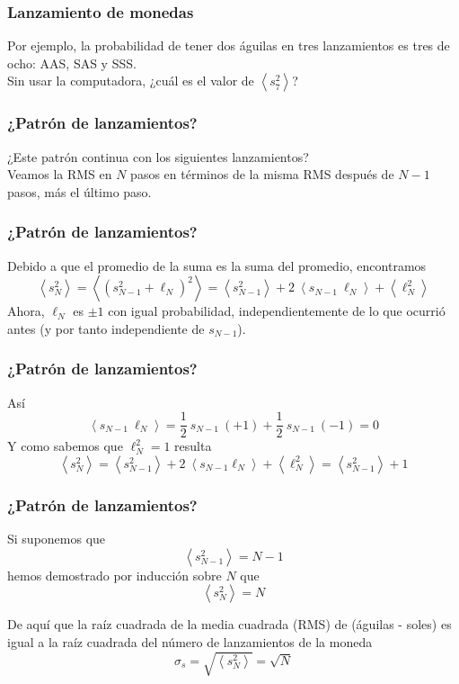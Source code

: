 \begin{frame}
\frametitle{Lanzamiento de monedas}
Por ejemplo, la probabilidad de tener dos águilas en tres lanzamientos es tres de ocho: AAS, SAS y SSS.
\\
\bigskip
Sin usar la computadora, ¿cuál es el valor de $\left\langle s_{7}^{2} \right\rangle$?
\end{frame}
\begin{frame}
\frametitle{¿Patrón de lanzamientos?}
¿Este patrón continua con los siguientes lanzamientos?
\\
\bigskip
Veamos la RMS en $N$ pasos en términos de la misma RMS después de $N -1$ pasos, más el último paso.
\end{frame}
\begin{frame}
\frametitle{¿Patrón de lanzamientos?}
Debido a que el promedio de la suma es la suma del promedio, encontramos
\fontsize{12}{12}\selectfont
\begin{equation}
\left\langle s_{N}^{2} \right\rangle = \left\langle (s_{N - 1}^{2} + \ell_{N})^{2} \right\rangle = \left\langle s_{N - 1}^{2} \right\rangle + 2 \: \left\langle s_{N - 1} \: \ell_{N} \right\rangle + \left\langle \ell_{N}^{2} \right\rangle
\label{eq:ecuacion_02_03}
\end{equation}
\fontsize{14}{14}\selectfont
Ahora, $\ell_{N}$ es $\pm 1$ con igual probabilidad, independientemente de lo que ocurrió antes (y por tanto independiente de $s_{N - 1}$).
\end{frame}
\begin{frame}
\frametitle{¿Patrón de lanzamientos?}
Así
\[ \left\langle s_{N - 1} \: \ell_{N} \right\rangle = \dfrac{1}{2} \: s_{N - 1} \: (+1) + \dfrac{1}{2} \: s_{N - 1} \: (-1) = 0 \]
\pause
Y como sabemos que $\ell_{N}^{2} = 1$ resulta
\fontsize{12}{12}\selectfont
\begin{equation}
\left\langle s_{N}^{2} \right\rangle = \left\langle s_{N - 1}^{2} \right\rangle + 2 \: \left\langle s_{N - 1} \ell_{N} \right\rangle + \left\langle \ell_{N}^{2} \right\rangle = \left\langle s_{N - 1}^{2} \right\rangle + 1
\label{eq:ecuacion_02_04}
\end{equation}
\end{frame}
\begin{frame}
\frametitle{¿Patrón de lanzamientos?}
Si suponemos que
\[ \left\langle s_{N - 1}^{2} \right\rangle = N - 1 \]
hemos demostrado por inducción sobre $N$  que
\[ \left\langle s_{N}^{2} \right\rangle = N \]
\end{frame}
\begin{frame}
De aquí que la raíz cuadrada de la media cuadrada (RMS) de (águilas - soles) es igual a la raíz cuadrada del número de lanzamientos de la moneda
\begin{equation}
\sigma_{s} = \sqrt{\left\langle s_{N}^{2} \right\rangle} = \sqrt{N}
\label{eq:ecuacion_05}
\end{equation}
\end{frame}
